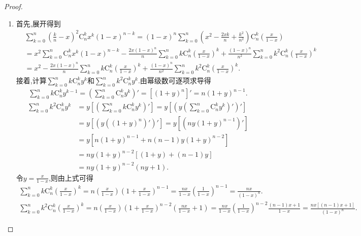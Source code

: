 \documentclass[../../main.tex]{subfiles}%
\begin{document}
\begin{proof}
\begin{enumerate}
\item 首先,展开得到
\begin{align}
&\sum_{k=0}^n{\left( \frac{k}{n}-x \right) ^2\mathrm{C}_{n}^{k}x^k\left( 1-x \right) ^{n-k}}=\left( 1-x \right) ^n\sum_{k=0}^n{\left( x^2-\frac{2xk}{n}+\frac{k^2}{n^2} \right) \mathrm{C}_{n}^{k}\left( \frac{x}{1-x} \right)}
\nonumber
\\
&=x^2\sum_{k=0}^n{\mathrm{C}_{n}^{k}x^k\left( 1-x \right) ^{n-k}}-\frac{2x\left( 1-x \right) ^n}{n}\sum_{k=0}^n{k\mathrm{C}_{n}^{k}\left( \frac{x}{1-x} \right) ^k}+\frac{\left( 1-x \right) ^n}{n^2}\sum_{k=0}^n{k^2\mathrm{C}_{n}^{k}\left( \frac{x}{1-x} \right) ^k}
\nonumber
\\
&=x^2-\frac{2x\left( 1-x \right) ^n}{n}\sum_{k=0}^n{k\mathrm{C}_{n}^{k}\left( \frac{x}{1-x} \right) ^k}+\frac{\left( 1-x \right) ^n}{n^2}\sum_{k=0}^n{k^2\mathrm{C}_{n}^{k}\left( \frac{x}{1-x} \right) ^k}.\label{equation-2388923747}
\end{align}
接着,计算$\sum_{k=0}^n{k\mathrm{C}_{n}^{k}y^k}$和$\sum_{k=0}^n{k^2\mathrm{C}_{n}^{k}y^k}$.由幂级数可逐项求导得
\begin{gather*}
\sum_{k=0}^n{k\mathrm{C}_{n}^{k}y^{k-1}}=\left( \sum_{k=0}^n{\mathrm{C}_{n}^{k}y^k} \right) ' =\left[ \left( 1+y \right) ^n \right] ' =n\left( 1+y \right) ^{n-1}.
\end{gather*}
\begin{align*}
\sum_{k=0}^n{k^2\mathrm{C}_{n}^{k}y^k}&=y\left[ \left( \sum_{k=0}^n{k\mathrm{C}_{n}^{k}y^k} \right) ' \right] =y\left[ \left( y\left( \sum_{k=0}^n{\mathrm{C}_{n}^{k}y^k} \right) ' \right) ' \right] 
\\
&=y\left[ \left( y\left( \left( 1+y \right) ^n \right) ' \right) ' \right] =y\left[ \left( ny\left( 1+y \right) ^{n-1} \right) ' \right] 
\\
&=y\left[ n\left( 1+y \right) ^{n-1}+n\left( n-1 \right) y\left( 1+y \right) ^{n-2} \right] 
\\
&=ny\left( 1+y \right) ^{n-2}\left[ \left( 1+y \right) +\left( n-1 \right) y \right] 
\\
&=ny\left( 1+y \right) ^{n-2}\left( ny+1 \right) .
\end{align*}
令$y=\frac{x}{1-x}$,则由上式可得
\begin{gather*}
\sum_{k=0}^n{k\mathrm{C}_{n}^{k}\left( \frac{x}{1-x} \right) ^k}=n\left( \frac{x}{1-x} \right) \left( 1+\frac{x}{1-x} \right) ^{n-1}=\frac{nx}{1-x}\left( \frac{1}{1-x} \right) ^{n-1}=\frac{nx}{\left( 1-x \right) ^n}.
\\
\sum_{k=0}^n{k^2\mathrm{C}_{n}^{k}\left( \frac{x}{1-x} \right) ^k}=n\left( \frac{x}{1-x} \right) \left( 1+\frac{x}{1-x} \right) ^{n-2}\left( \frac{nx}{1-x}+1 \right) =\frac{nx}{1-x}\left( \frac{1}{1-x} \right) ^{n-2}\frac{\left( n-1 \right) x+1}{1-x}=\frac{nx\left[ \left( n-1 \right) x+1 \right]}{\left( 1-x \right) ^n}.

\end{gather*}
\end{enumerate}
\end{proof}
\end{document}
